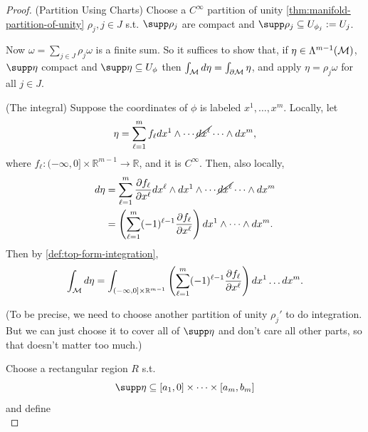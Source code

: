 \documentclass[../main.tex]{subfiles}
\begin{document}
    \begin{proof}
        (Partition Using Charts) Choose a \(C^\infty\) partition of unity 
        \cref{thm:manifold-partition-of-unity} \(\rho_j, j \in J\) s.t. 
        \(\supp \rho_j\) are compact and \(\supp \rho_j \subseteq U_{\phi_j} 
        := U_j\). \par
        Now \(\omega = \sum_{j \in J}^{} \rho_j \omega\) is a finite sum. So 
        it suffices to show that, if \(\eta \in \form{m-1}{M}\), \(\supp \eta\) 
        compact and \(\supp\eta \subseteq U_\phi\) then \(\int_{\manifold[M]}^{}
        d\eta = \int_{\partial \manifold[M]}^{} \eta\), and apply 
        \(\eta = \rho_j\omega\) for all \(j \in J\). \par
        (The integral)
        Suppose the coordinates of \(\phi\) is labeled \(x^1, \dots, x^m\).
        Locally, let 
        \[
        \eta = \sum_{\ell=1}^{m} f_\ell dx^1\wedge \cdots \cancel{dx^\ell} \cdots 
        \wedge dx^m,
        \]
        where \(f_\ell : (-\infty, 0] \times \mathbb{R}^{m-1} \to \mathbb{R}\), and 
        it is \(C^\infty\). Then, also locally, 
        \[
        \begin{aligned}
            d\eta &= \sum_{\ell = 1}^{m} \frac{\partial f_\ell}{\partial x^\ell} dx^\ell 
            \wedge dx^1\wedge \cdots \cancel{dx^\ell} \cdots \wedge dx^m \\
            &= \left(\sum_{\ell=1}^{m} (-1)^{\ell-1}
            \frac{\partial f_\ell}{\partial x^\ell}\right)dx^1\wedge \dots \wedge dx^m.
        \end{aligned}
        \]
        Then by \cref{def:top-form-integration}, 
        \[
        \int_{\manifold[M]}^{}d\eta = \int_{(-\infty, 0]\times \mathbb{R}^{m-1}}^{} 
        \left(\sum_{\ell=1}^{m} (-1)^{\ell-1}
        \frac{\partial f_\ell}{\partial x^\ell}\right)dx^1\dots dx^m.
        \]\par
        (To be precise, we need to choose another partition of unity \(\rho_j'\) to 
        do integration. But we can just choose it to cover all of \(\supp \eta\) 
        and don't care all other parts, so that doesn't matter too much.)\par
        Choose a rectangular region \(R\) s.t. 
        \[
        \supp \eta \subseteq [a_1, 0]\times \dots \times [a_m, b_m]
        \]
        and define 
        \[
\]
\end{proof}
\end{document}
